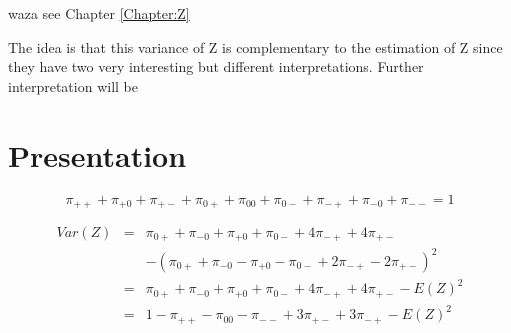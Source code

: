 \documentclass[12pt,a4paper,oneside]{book}
\begin{document}
waza see Chapter \ref{Chapter:Z}

The idea is that this variance of Z is complementary to the estimation of Z since they have two very interesting but different interpretations.
Further interpretation will be 

\section{Presentation}



\begin{equation}
\pi_{++} + \pi_{+0} + \pi_{+-} + \pi_{0+} + \pi_{00} + \pi_{0-} + \pi_{-+} + \pi_{-0} + \pi_{--} = 1 
\end{equation}

\begin{eqnarray}
Var(Z) &=& \pi_{0+} + \pi_{-0} + \pi_{+0} + \pi_{0-} +4\pi_{-+} +4\pi_{+-} \nonumber \nonumber \\ 
&&	- (\pi_{0+} + \pi_{-0} - \pi_{+0} - \pi_{0-} +2\pi_{-+} -2\pi_{+-})^2 \nonumber \\
&=& \pi_{0+} + \pi_{-0} + \pi_{+0} + \pi_{0-} +4\pi_{-+} +4\pi_{+-} - E(Z)^2 \nonumber \\
&=& 1 - \pi_{++} - \pi_{00} - \pi_{--} + 3\pi_{+-} + 3\pi_{-+} - E(Z)^2
\end{eqnarray}
\end{document}
